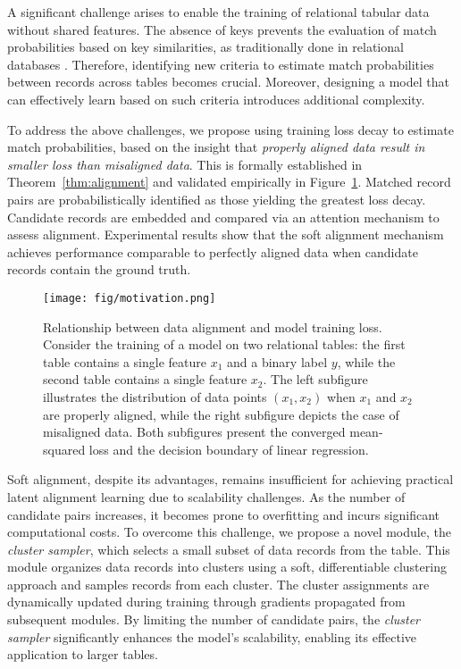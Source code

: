 A significant challenge arises to enable the training of relational tabular data without shared features. The absence of keys prevents the evaluation of match probabilities based on key similarities, as traditionally done in relational databases \cite{mishra1992join}. Therefore, identifying new criteria to estimate match probabilities between records across tables becomes crucial. Moreover, designing a model that can effectively learn based on such criteria introduces additional complexity.

To address the above challenges, we propose using training loss decay to estimate match probabilities, based on the insight that \textit{properly aligned data result in smaller loss than misaligned data}. This is formally established in Theorem~\ref{thm:alignment} and validated empirically in Figure~\ref{fig:motivation}. Matched record pairs are probabilistically identified as those yielding the greatest loss decay. Candidate records are embedded and compared via an attention mechanism to assess alignment. Experimental results show that the soft alignment mechanism achieves performance comparable to perfectly aligned data when candidate records contain the ground truth.




\begin{figure}[ht]
    \centering
    \texttt{[image: fig/motivation.png]}
    \caption{Relationship between data alignment and model training loss. Consider the training of a model on two relational tables: the first table contains a single feature \(x_1\) and a binary label \(y\), while the second table contains a single feature \(x_2\). The left subfigure illustrates the distribution of data points \((x_1, x_2)\) when \(x_1\) and \(x_2\) are properly aligned, while the right subfigure depicts the case of misaligned data. Both subfigures present the converged mean-squared loss and the decision boundary of linear regression.}
    \label{fig:motivation}
\end{figure}

Soft alignment, despite its advantages, remains insufficient for achieving practical latent alignment learning due to scalability challenges. As the number of candidate pairs increases, it becomes prone to overfitting and incurs significant computational costs. To overcome this challenge, we propose a novel module, the \textit{cluster sampler}, which selects a small subset of data records from the table. This module organizes data records into clusters using a soft, differentiable clustering approach and samples records from each cluster. The cluster assignments are dynamically updated during training through gradients propagated from subsequent modules. By limiting the number of candidate pairs, the \textit{cluster sampler} significantly enhances the model's scalability, enabling its effective application to larger tables.

